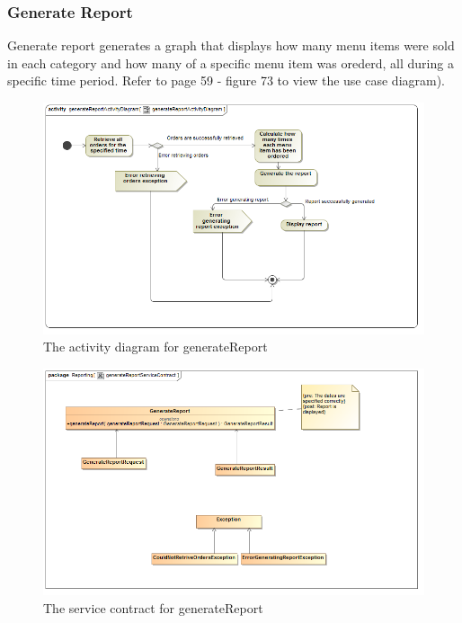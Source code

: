 \documentclass[a4paper,12pt]{report}
\begin{document}
\subsubsection{Generate Report}
Generate report generates a graph that displays how many menu items were sold in each category and how many of a specific menu item was orederd, all during a specific time period. Refer to page 59 - figure 73 to view the use case diagram).
\begin{figure}[H]
 \centering
  \includegraphics[width=1.0\textwidth]{../images/generateReportActivityDiagram.png}
    \caption{The activity diagram for generateReport}
    \end{figure}
    
    \begin{figure}[H]
  \centering
    \includegraphics[width=1.0\textwidth]{../images/generateReportServiceContract.png}
    \caption{The service contract for generateReport} 
\end{figure}
\end{document}
